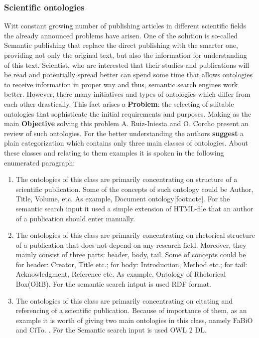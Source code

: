 		\subsubsection{Scientific ontologies}
		Witt constant growing number of publishing articles in different scientific fields the already announced problems have arisen. One of the solution is so-called Semantic publishing that replace the direct publishing with the smarter one, providing not only the original text, but also the information for understanding of this text. Scientist, who are interested that their studies and publications will be read and potentially spread better can spend some time that allows ontologies to receive information in proper way and thus, semantic search engines work better. However, there many initiatives and types of ontologies which differ from each other drastically. This fact arises a \textbf{Problem}: the selecting of suitable ontologies that sophisticate the initial requirements and purposes. Making as the main \textbf{Objective} solving this problem A. Ruiz-Iniesta and O. Corcho present an review of such ontologies\cite{Cor14}.
		For the better understanding the authors \textbf{suggest} a plain categorization which contains only three main classes of ontologies. About these classes and relating to them examples it is spoken in the following enumerated paragraph:
			\begin{enumerate}
				\item {}\frqq The ontologies of this class are primarily concentrating on structure of a scientific publication. Some of the concepts of such ontology could be Author, Title, Volume, etc. As example, Document ontology[footnote]. For the semantic search input it used a simple extension of HTML-file that an author of a publication should enter manually.
				
				\item {}\frqq The ontologies of this class are primarily concentrating on rhetorical structure of a publication that does not depend on any research field. Moreover, they mainly consist of three parts: header, body, tail. Some of concepts could be for header: Creator, Title etc.; for body: Introduction, Method etc.; for tail: Acknowledgment, Reference etc. As example, Ontology of Rhetorical Box(ORB). For the semantic search intput is used RDF format.  
				
				\item {}\frqq  The ontologies of this class are primarily concentrating on citating and referencing of a scientific publication. Because of importance of them, as an example it is worth of giving two main ontologies in this class, namely FaBiO and CiTo. \frqq\cite{Per12}. For the Semantic search input is used OWL 2 DL. 
			\end{enumerate}
